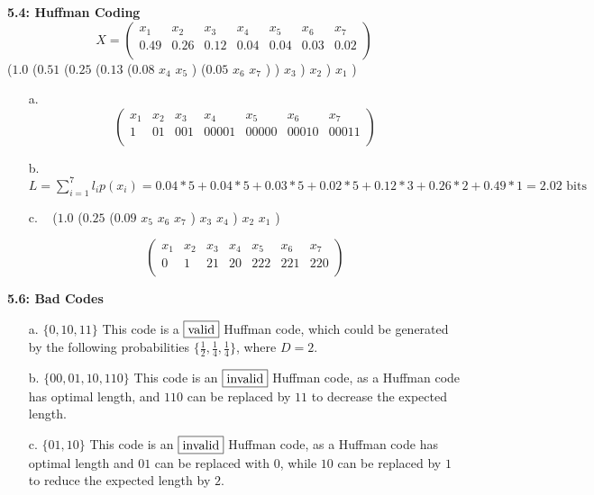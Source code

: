 \documentclass[10pt]{article}
\begin{document}
\begin{tiny}
\begin{multicols}{3}
\textbf{5.4: Huffman Coding}
\[
 X =
 \begin{pmatrix}
	x_1 & x_2 & x_3 & x_4 & x_5 & x_6 & x_7 \\
	0.49 & 0.26 & 0.12 & 0.04 & 0.04 & 0.03 & 0.02 \\
 \end{pmatrix}
\]
($1.0$ ($0.51$ ($0.25$ ($0.13$ ($0.08$ $x_4$ $x_5$ ) ($0.05$ $x_6$ $x_7$ ) ) $x_3$ ) $x_2$ ) $x_1$ )
\begin{itemize}
	\item[a.] 
\[
 \begin{pmatrix}
	x_1 & x_2 & x_3 & x_4   & x_5   & x_6   & x_7 \\
	1   & 01  & 001 & 00001 & 00000 & 00010 & 00011 \\
 \end{pmatrix}
\]
	\item[b.] $L = \sum_{i=1}^7 l_i p(x_i) = 0.04*5 + 0.04*5 + 0.03*5 + 0.02*5 + 0.12*3 + 0.26*2 + 0.49*1 = 2.02\textrm{ bits}$

	\item[c.] 
\
($1.0$  ($0.25$ ($0.09$ $x_5$ $x_6$ $x_7$ ) $x_3$ $x_4$ ) $x_2$ $x_1$ )

\[
 \begin{pmatrix}
	x_1 & x_2 & x_3 & x_4 & x_5 & x_6 & x_7 \\
	0   & 1   & 21  & 20  & 222 & 221 & 220 \\
 \end{pmatrix}
\]
\end{itemize}

\textbf{5.6: Bad Codes}

\begin{itemize}
	\item[a.] $ \{0, 10, 11 \} $ This code is a $\fbox{valid}$ Huffman code, which could be generated by the following probabilities $\{ \frac{1}{2}, \frac{1}{4}, \frac{1}{4} \}$, where $D=2$.
	\item[b.] $ \{00, 01, 10, 110 \} $ This code is an $\fbox{invalid}$ Huffman code, as a Huffman code has optimal length, and $110$ can be replaced by $11$ to decrease the expected length.  
	\item[c.] $ \{01, 10 \} $ This code is an $\fbox{invalid}$ Huffman code, as a Huffman code has optimal length and $01$ can be replaced with $0$, while $10$ can be replaced by $1$ to reduce the expected length by $2$.
\end{itemize}


\end{multicols}
\end{tiny}
\end{document}
